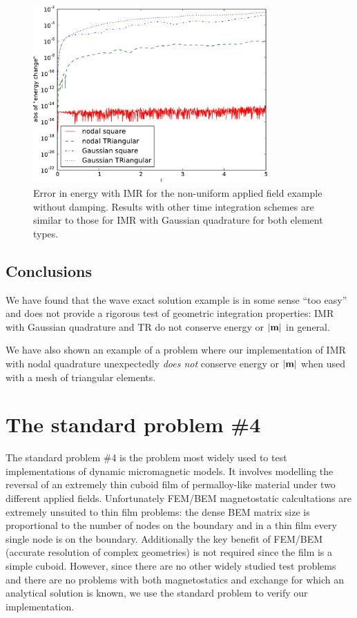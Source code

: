 \begin{figure}
  \centering
  \includegraphics[width=0.8\textwidth]
  {plots/nonuniform-h-triangles-energy-error/absofenergychangevstimes.pdf}
  \caption{Error in energy with IMR for the non-uniform applied field example without damping.
 Results with other time integration schemes are similar to those for IMR with Gaussian quadrature for both element types.}
  \label{fig:energy-error-triangle-mesh}
\end{figure}

\subsection{Conclusions}

We have found that the wave exact solution example is in some sense ``too easy'' and does not provide a rigorous test of geometric integration properties: IMR with Gaussian quadrature and TR do not conserve energy or $\left|{\boldsymbol{\mathrm{m}}} \right|$ in general.

We have also shown an example of a problem where our implementation of IMR with nodal quadrature unexpectedly \emph{does not} conserve energy or $\left|{\boldsymbol{\mathrm{m}}} \right|$ when used with a mesh of triangular elements.


\FloatBarrier
\section{The \mumag standard problem \#4}

The \mumag standard problem \#4 \cite{mumag-website} is the problem most widely used to test implementations of dynamic micromagnetic models.
It involves modelling the reversal of an extremely thin cuboid film of permalloy-like material under two different applied fields.
Unfortunately FEM/BEM magnetostatic calcultations are extremely unsuited to thin film problems: the dense BEM matrix size is proportional to the number of nodes on the boundary and in a thin film every single node is on the boundary.
Additionally the key benefit of FEM/BEM (accurate resolution of complex geometries) is not required since the film is a simple cuboid.
However, since there are no other widely studied test problems and there are no problems with both magnetostatics and exchange for which an analytical solution is known, we use the standard problem to verify our implementation.


